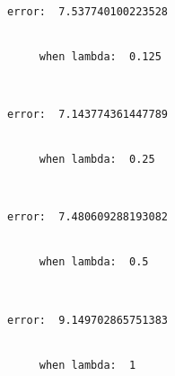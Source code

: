 \documentclass[11pt]{article}
\begin{document}
    \begin{Verbatim}[commandchars=\\\{\}]
     error:  7.537740100223528


     when lambda:  0.125

    \end{Verbatim}

    \begin{center}
    \end{center}
    { \hspace*{\fill} \\}
    
    \begin{Verbatim}[commandchars=\\\{\}]
     error:  7.143774361447789


     when lambda:  0.25

    \end{Verbatim}

    \begin{center}
    \end{center}
    { \hspace*{\fill} \\}
    
    \begin{Verbatim}[commandchars=\\\{\}]
     error:  7.480609288193082


     when lambda:  0.5

    \end{Verbatim}

    \begin{center}
    \end{center}
    { \hspace*{\fill} \\}
    
    \begin{Verbatim}[commandchars=\\\{\}]
     error:  9.149702865751383


     when lambda:  1

    \end{Verbatim}

    \begin{center}
    \end{center}
    { \hspace*{\fill} \\}
    
\end{document}
